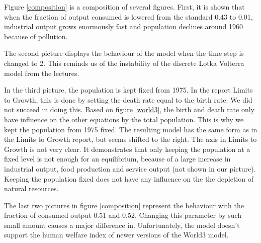 \documentclass[10pt,a4paper]{scrartcl}
\begin{document}
Figure \ref{composition} is a composition of several figures. First, it is shown that when the fraction of output consumed is lowered from the standard 0.43 to 0.01, industrial output grows enormously fast and population declines around 1960 because of pollution.

The second picture displays the behaviour of the model when the time step is changed to 2. This reminds us of the instability of the discrete Lotka Volterra model from the lectures.

In the third picture, the population is kept fixed from 1975. In the report Limits to Growth, this is done by setting the death rate equal to the birth rate. We did not succeed in doing this. Based on figure \ref{world3}, the birth and death rate only have influence on the other equations by the total population. This is why we kept the population from 1975 fixed. The resulting model has the same form as in the Limits to Growth report, but seems shifted to the right. The axis in Limits to Growth is not very clear. It demonstrates that only keeping the population at a fixed level is not enough for an equilibrium, because of a large increase in industrial output, food production and service output (not shown in our picture). Keeping the population fixed does not have any influence on the the depletion of natural resources.

The last two pictures in figure \ref{composition} represent the behaviour with the fraction of consumed output 0.51 and 0.52. Changing this parameter by such small amount causes a major difference in. Unfortunately, the model doesn't support the human welfare index of newer versions of the World3 model.
\end{document}

